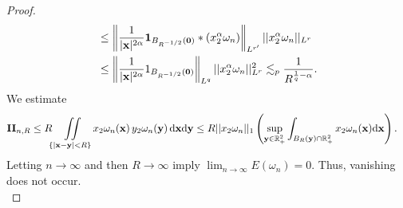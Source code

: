 \documentclass[11pt]{amsart}
\theoremstyle{definition}
\theoremstyle{definition}
\numberwithin{equation}{section}
\newcommand{\0}{\emptyset}
\newcommand{\bfx}{{\bf x}}
\newcommand{\bfy}{{\bf y}}
\newcommand{\dd}{\mathrm{d}}
\begin{document}
\begin{proof}
\begin{align*}
					&\leq \left\|\frac{1}{|\bfx|^{2\alpha}}\mathbf{1}_{B_{R^{-1/2}}(\mathbf{0})}*(x_2^{\alpha}\omega_n)\right\|_{L^{r'}}||x_2^{\alpha}\omega_n||_{L^{r}} \\
					&\leq \left\|\frac{1}{|\bfx|^{2\alpha}}1_{B_{R^{-1/2}}(\mathbf{0})}\right\|_{L^{q}}||x_2^{\alpha}\omega_n||_{L^{r}}^{2} 
					\lesssim_{p} \frac{1}{R^{\frac{1}{q}-\alpha}}.
				\end{align*}
				We estimate 
				\begin{align*}
					\mathbf{II}_{n, R}  
					&\le R\iint\limits_{\{|\bfx - \bfy|< R\}} x_2 \omega_n(\bfx) \, y_2\omega_n(\bfy) \, \dd \bfx\dd \bfy \le R||x_2\omega_{n}||_{1} \left(\sup_{\bfy\in \mathbb{R}^{2}_{+}}\int_{B_R(\bfy)\cap \mathbb{R}^{2}_{+}}x_2\omega_n(\bfx)  \dd \bfx\right). 
				\end{align*}
				Letting $n\to\infty$ and then $R\to\infty$ imply $\lim_{n\to\infty}E(\omega_n)=0$. Thus, vanishing does not occur.\\
				

\end{proof}
\end{document}
